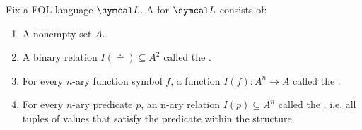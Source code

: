 \begin{definition}\label{def:first_order_structure}\cite[definition 4.1]{Nerode2012}
  Fix a FOL language \( \Cal{L} \). A  for \( \Cal{L} \) consists of:
  \begin{enumerate}
    \item A nonempty set \( A \).
    \item A binary relation \( I(\doteq) \subseteq A^2 \) called the .
    \item For every \( n \)-ary function symbol \( f \), a function \( I(f): A^n \to A \) called the .
    \item For every \( n \)-ary predicate \( p \), an n-ary relation \( I(p) \subseteq A^n \) called the , i.e. all tuples of values that satisfy the predicate within the structure.
  \end{enumerate}
\end{definition}

